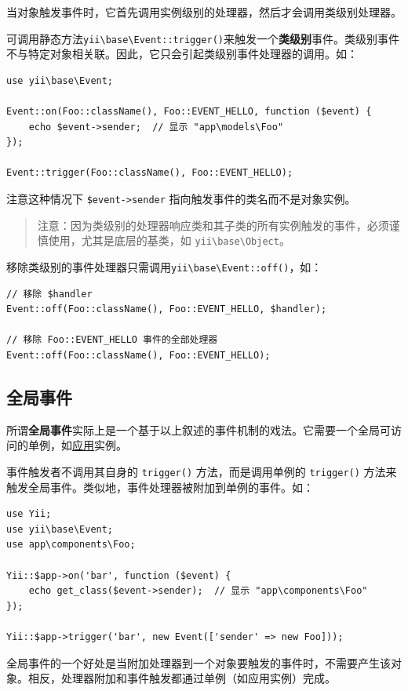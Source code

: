 当对象触发事件时，它首先调用实例级别的处理器，然后才会调用类级别处理器。

可调用静态方法\texttt{yii{\allowbreak{}\textbackslash}base{\allowbreak{}\textbackslash}Event\allowbreak{}::\allowbreak{}trigger()}来触发一个\textbf{类级别}事件。类级别事件不与特定对象相关联。因此，它只会引起类级别事件处理器的调用。如：

\lstset{language=php}\begin{lstlisting}
use yii\base\Event;

Event::on(Foo::className(), Foo::EVENT_HELLO, function ($event) {
    echo $event->sender;  // 显示 "app\models\Foo"
});

Event::trigger(Foo::className(), Foo::EVENT_HELLO);
\end{lstlisting}
注意这种情况下 \lstinline|$event->sender| 指向触发事件的类名而不是对象实例。

\begin{quote}注意：因为类级别的处理器响应类和其子类的所有实例触发的事件，必须谨慎使用，尤其是底层的基类，如 \texttt{yii{\allowbreak{}\textbackslash}base{\allowbreak{}\textbackslash}Object}。

\end{quote}
移除类级别的事件处理器只需调用\texttt{yii{\allowbreak{}\textbackslash}base{\allowbreak{}\textbackslash}Event\allowbreak{}::\allowbreak{}off()}，如：

\lstset{language=php}\begin{lstlisting}
// 移除 $handler
Event::off(Foo::className(), Foo::EVENT_HELLO, $handler);

// 移除 Foo::EVENT_HELLO 事件的全部处理器
Event::off(Foo::className(), Foo::EVENT_HELLO);
\end{lstlisting}
\subsection{全局事件}
所谓\textbf{全局事件}实际上是一个基于以上叙述的事件机制的戏法。它需要一个全局可访问的单例，如\hyperref[structure-applications.md]{应用}实例。

事件触发者不调用其自身的 \lstinline|trigger()| 方法，而是调用单例的 \lstinline|trigger()| 方法来触发全局事件。类似地，事件处理器被附加到单例的事件。如：

\lstset{language=php}\begin{lstlisting}
use Yii;
use yii\base\Event;
use app\components\Foo;

Yii::$app->on('bar', function ($event) {
    echo get_class($event->sender);  // 显示 "app\components\Foo"
});

Yii::$app->trigger('bar', new Event(['sender' => new Foo]));
\end{lstlisting}
全局事件的一个好处是当附加处理器到一个对象要触发的事件时，不需要产生该对象。相反，处理器附加和事件触发都通过单例（如应用实例）完成。

